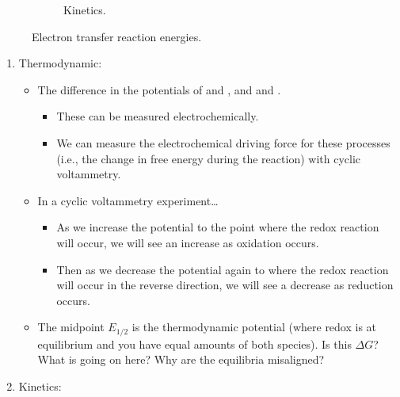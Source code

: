 \documentclass[../notes.tex]{subfiles}
\begin{document}
\begin{itemize}
\begin{figure}[H]
\begin{subfigure}[b]{0.4\linewidth}
            \caption{Kinetics.}
            \label{fig:e-transferEnergyb}
        \end{subfigure}
        \caption{Electron transfer reaction energies.}
        \label{fig:e-transferEnergy}
    \end{figure}
    \begin{enumerate}
        \item Thermodynamic:
        \begin{itemize}
            \item The difference in the potentials of  and , and  and .
            \begin{itemize}
                \item These can be measured electrochemically.
                \item We can measure the electrochemical driving force for these processes (i.e., the change in free energy during the reaction) with cyclic voltammetry.
            \end{itemize}
            \item In a cyclic voltammetry experiment\dots
            \begin{itemize}
                \item As we increase the potential to the point where the redox reaction will occur, we will see an increase as oxidation occurs.
                \item Then as we decrease the potential again to where the redox reaction will occur in the reverse direction, we will see a decrease as reduction occurs.
            \end{itemize}
            \item The midpoint $E_{1/2}$ is the thermodynamic potential (where redox is at equilibrium and you have equal amounts of both species). Is this $\Delta G$? What is going on here? Why are the equilibria misaligned?
        \end{itemize}
        \item Kinetics:
        \begin{itemize}

\end{itemize}
\end{enumerate}
\end{itemize}
\end{document}
